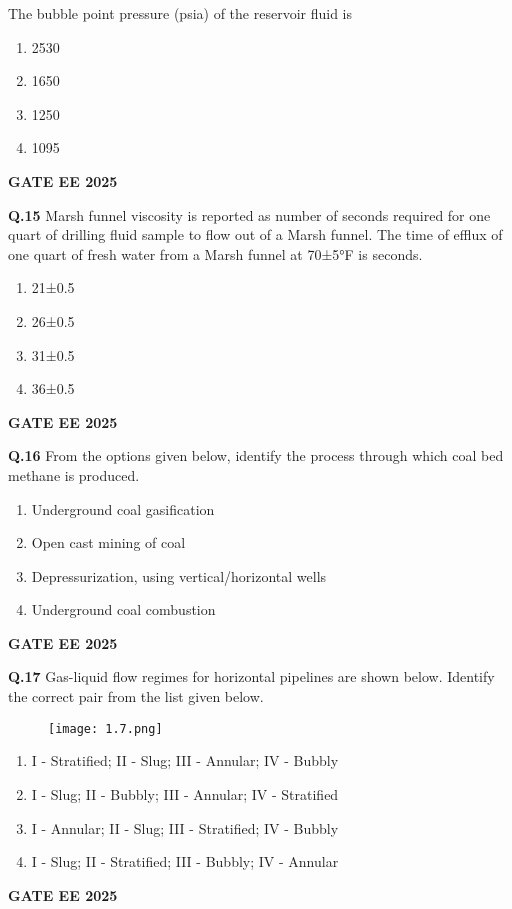 \documentclass{article}
\begin{document}
The bubble point pressure (psia) of the reservoir fluid is
\begin{enumerate}[label=(\Alph*)]
    \item 2530
    \item 1650
    \item 1250
    \item 1095
\end{enumerate}
\textbf{GATE EE 2025}

\vspace{0.5cm}

\textbf{Q.15} Marsh funnel viscosity is reported as number of seconds required for one quart of drilling fluid sample to flow out of a Marsh funnel. The time of efflux of one quart of fresh water from a Marsh funnel at 70±5°F is \underline{\hspace{1cm}} seconds.
\begin{enumerate}[label=(\Alph*)]
    \item 21±0.5
    \item 26±0.5
    \item 31±0.5
    \item 36±0.5
\end{enumerate}
\textbf{GATE EE 2025}

\vspace{0.5cm}

\textbf{Q.16} From the options given below, identify the process through which coal bed methane is produced.
\begin{enumerate}[label=(\Alph*)]
    \item Underground coal gasification
    \item Open cast mining of coal
    \item Depressurization, using vertical/horizontal wells
    \item Underground coal combustion
\end{enumerate}
\textbf{GATE EE 2025}

\vspace{0.5cm}

\textbf{Q.17} Gas-liquid flow regimes for horizontal pipelines are shown below. Identify the correct pair from the list given below.

\begin{figure}[ht]
\centering
\texttt{[image: 1.7.png]}

\end{figure}

\begin{enumerate}[label=(\Alph*)]
    \item I - Stratified; II - Slug; III - Annular; IV - Bubbly
    \item I - Slug; II - Bubbly; III - Annular; IV - Stratified
    \item I - Annular; II - Slug; III - Stratified; IV - Bubbly
    \item I - Slug; II - Stratified; III - Bubbly; IV - Annular
\end{enumerate}
\textbf{GATE EE 2025}
\end{document}
